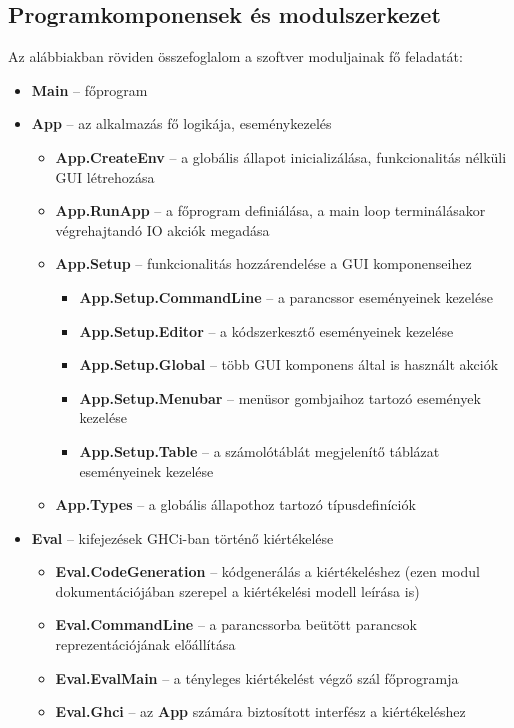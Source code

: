 \subsection{Programkomponensek és modulszerkezet}

Az alábbiakban röviden összefoglalom a szoftver moduljainak fő feladatát:

\begin{itemize}
	\item \textbf{Main} -- főprogram
	\item \textbf{App} -- az alkalmazás fő logikája, eseménykezelés
	\begin{itemize}
		\item \textbf{App.CreateEnv} -- a globális állapot inicializálása, funkcionalitás nélküli GUI létrehozása
		\item \textbf{App.RunApp} -- a főprogram definiálása, a main loop terminálásakor végrehajtandó IO akciók megadása
		\item \textbf{App.Setup}	-- funkcionalitás hozzárendelése a GUI komponenseihez
		\begin{itemize}
			\item \textbf{App.Setup.CommandLine} -- a parancssor eseményeinek kezelése
			\item \textbf{App.Setup.Editor} -- a kódszerkesztő eseményeinek kezelése
			\item \textbf{App.Setup.Global} -- több GUI komponens által is használt akciók
			\item \textbf{App.Setup.Menubar} -- menüsor gombjaihoz tartozó események kezelése
			\item \textbf{App.Setup.Table} -- a számolótáblát megjelenítő táblázat eseményeinek kezelése
		\end{itemize}
		\item \textbf{App.Types} -- a globális állapothoz tartozó típusdefiníciók
	\end{itemize}
	\item \textbf{Eval} -- kifejezések GHCi-ban történő kiértékelése
	\begin{itemize}
		\item \textbf{Eval.CodeGeneration} -- kódgenerálás a kiértékeléshez (ezen modul dokumentációjában szerepel a kiértékelési modell leírása is)
		\item \textbf{Eval.CommandLine} -- a parancssorba beütött parancsok reprezentációjának előállítása
		\item \textbf{Eval.EvalMain} -- a tényleges kiértékelést végző szál főprogramja
		\item \textbf{Eval.Ghci} -- az \textbf{App} számára biztosított interfész a kiértékeléshez

\end{itemize}
\end{itemize}
